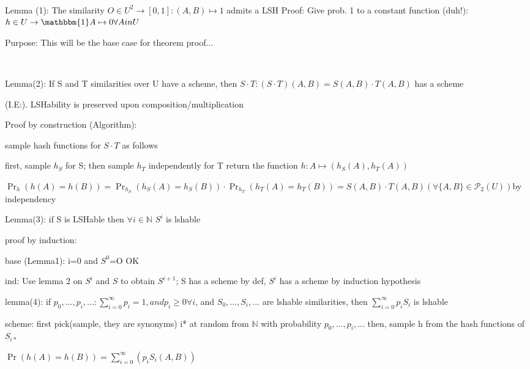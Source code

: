 \documentclass{report}
\begin{document}
	
	
	
	\
	
	Lemma (1): The similarity $O \in U^2 \to [0, 1] : (A, B) \mapsto 1$ admits a LSH
	Proof: Give prob. 1 to a constant function (duh!): $h \in U \to \mathbbm{1} A \mapsto 0 \forall A in U$
	
	Purpose: This will be the base case for theorem proof...
	
	
	\
	
	Lemma(2): If S and T similarities over U have a scheme, then $S \cdot T : (S \cdot T)(A, B) = S(A, B)\cdot T(A, B)$ has a scheme
	
	(I.E:). LSHability is preserved upon composition/multiplication
	
	Proof by construction (Algorithm): 
	
	sample hash functions for $S \cdot T$ as follows
	
	first, sample $h_S$ for S;
	then sample $h_T$ independently for T
	return the function $h : A \mapsto (h_S(A), h_T(A))$
	
	$\Pr_h(h(A)=h(B)) = \Pr_{h_S}(h_S(A)=h_S(B)) \cdot \Pr_{h_T}(h_T(A)=h_T(B)) = S(A, B) \cdot T(A, B) (\forall \{A, B\} \in \mathcal{P}_2(U))$by independency
	
	
	Lemma(3): if S is LSHable then $\forall i \in \mathbb{N}$ $S^i$ is lshable
	
	proof by induction:
	
	base (Lemma1): i=0 and $S^0$=O OK
	
	ind: Use lemma 2 on $S^i$ and $S$ to obtain $S^{i+1}$; S has a scheme by def, $S^i$ has a scheme by induction hypothesis
	
	
	lemma(4): if $p_0, ..., p_i, ... : \sum_{i=0}^{\infty}p_i=1 , and p_i\geq 0 \forall i$, and $S_0, ..., S_i, ...$ are lshable similarities, then $\sum_{i=0}^{\infty}p_iS_i$ is lshable
	
	scheme: first pick(sample, they are synonyms) i* at random from $\mathbb{N}$ with probability $p_0, ..., p_i, ...$
	then, sample h from the hash functions of $S_{i*}$
	
	$\Pr(h(A)=h(B))=\sum_{i=0}^{\infty}(p_i S_i(A, B))$
	
\end{document}
